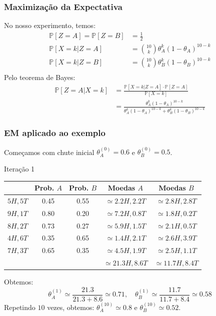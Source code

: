 \documentclass{beamer}
\newcommand{\Prob}{\mathbb{P}}
\begin{document}
\begin{frame}

	\frametitle{Maximização da Expectativa}
	No nosso experimento, temos:
	\pause
	\begin{align*}
	\Prob[Z=A] = \Prob[Z=B] &= \frac12 \\
	\Prob[X=k|Z=A] &= \binom{10}{k}\theta_A^k(1-\theta_A)^{10-k} \\
	\Prob[X=k|Z=B] &= \binom{10}{k}\theta_B^k(1-\theta_B)^{10-k} \\
	\end{align*}
	\pause
	Pelo teorema de Bayes:
	\begin{align*}
	\Prob[Z=A|X=k] &= \frac{\Prob[X=k|Z=A]\cdot \Prob[Z=A]}{\Prob[X=k]} \\
	 &= \frac{\theta_A^{k}(1-\theta_A)^{10-k}}{
	 	\theta_A^{k}(1-\theta_A)^{10-k} + \theta_B^{k}(1-\theta_B)^{10-k}}
	\end{align*}

\end{frame}

\begin{frame}

	\frametitle{EM aplicado ao exemplo}
	Começamos com chute inicial $\theta^{(0)}_A = 0.6$ e
	$\theta^{(0)}_B = 0.5$.\pause
	\begin{block}{Iteração 1}
		\begin{center}
			\begin{tabular}{l | c | c | c | c}
				& Prob. $A$ & Prob. $B$ &
				Moedas $A$ & Moedas $B$ \\
				\hline
				$5H, 5T$ & 0.45 & 0.55
				& $\simeq 2.2H, 2.2T$ & $\simeq 2.8H, 2.8T$ \\
				$9H, 1T$ & 0.80 & 0.20
				& $\simeq 7.2H, 0.8T$ & $\simeq 1.8H, 0.2T$ \\
				$8H, 2T$ & 0.73 & 0.27
				& $\simeq 5.9H, 1.5T$ & $\simeq 2.1H, 0.5T$ \\
				$4H, 6T$ & 0.35 & 0.65
				& $\simeq 1.4H, 2.1T$ & $\simeq 2.6H, 3.9T$ \\
				$7H, 3T$ & 0.65 & 0.35
				& $\simeq 4.5H, 1.9T$ & $\simeq 2.5H, 1.1T$ \\
				\hline
				&  &  &$\simeq 21.3H, 8.6T$ & $\simeq 11.7H, 8.4T$
			\end{tabular}
		\end{center}
	\end{block}
	\pause
	Obtemos:
	\[
	\theta^{(1)}_A \simeq \frac{21.3}{21.3+8.6} \simeq 0.71,
	\quad \theta^{(1)}_B \simeq \frac{11.7}{11.7+8.4} \simeq 0.58
	\]
	\pause
	Repetindo $10$ vezes, obtemos:
	$\theta^{(10)}_A\simeq 0.8$ e $\theta^{(10)}_B\simeq 0.52$.
\end{frame}
\end{document}
